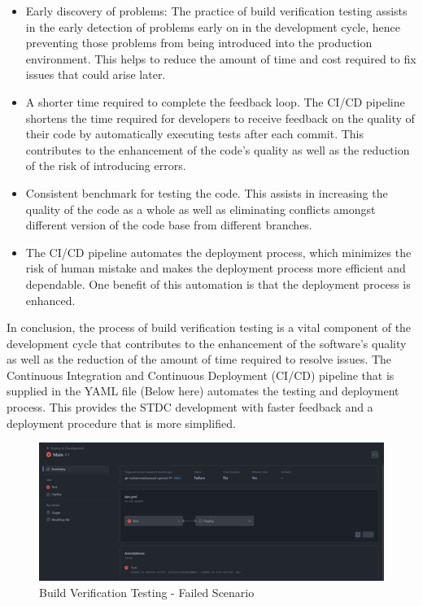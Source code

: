 \begin{justify}
\begin{itemize}
    \item Early discovery of problems: The practice of build verification testing assists in the early detection of problems early on in the development cycle, hence preventing those problems from being introduced into the production environment. This helps to reduce the amount of time and cost required to fix issues that could arise later.
    
    \item A shorter time required to complete the feedback loop. The CI/CD pipeline shortens the time required for developers to receive feedback on the quality of their code by automatically executing tests after each commit. This contributes to the enhancement of the code's quality as well as the reduction of the risk of introducing errors.

    \item Consistent benchmark for testing the code. This assists in increasing the quality of the code as a whole as well as eliminating conflicts amongst different version of the code base from different branches.

    \item The CI/CD pipeline automates the deployment process, which minimizes the risk of human mistake and makes the deployment process more efficient and dependable. One benefit of this automation is that the deployment process is enhanced.
\end{itemize}

\vspace{0.25cm}
\newendline In conclusion, the process of build verification testing is a vital component of the development cycle that contributes to the enhancement of the software's quality as well as the reduction of the amount of time required to resolve issues. The Continuous Integration and Continuous Deployment (CI/CD) pipeline that is supplied in the YAML file (Below here) automates the testing and deployment process. This provides the STDC development with faster feedback and a deployment procedure that is more simplified.

\begin{figure}[H]
    \centerline{\includegraphics[width=150mm,scale=1]{figures/implementation_and_testing/testing/BVT/failedtest.png}}
    \caption{Build Verification Testing - Failed Scenario}
    \label{Build Verification Testing - Failed Scenario}
\end{figure}



\end{justify}
